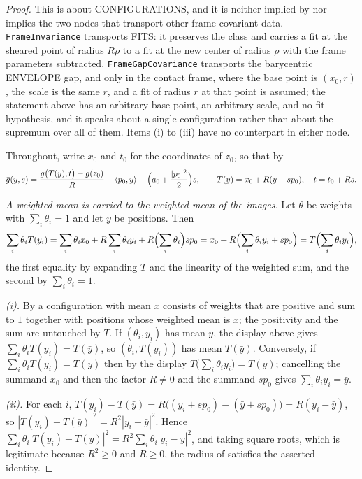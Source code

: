 \begin{proof}
This is about CONFIGURATIONS, and it is neither implied by nor implies the two
nodes that transport other frame-covariant data. \texttt{FrameInvariance}
transports FITS: it preserves the class and carries a fit at the sheared point
of radius $R\rho$ to a fit at the new center of radius $\rho$ with the frame
parameters subtracted. \texttt{FrameGapCovariance} transports the barycentric
ENVELOPE gap, and only in the contact frame, where the base point is $(x_0,r)$,
the scale is the same $r$, and a fit of radius $r$ at that point is assumed;
the statement above has an arbitrary base point, an arbitrary scale, and no fit
hypothesis, and it speaks about a single configuration rather than about the
supremum over all of them. Items (i) to (iii) have no counterpart in either
node.

Throughout, write $x_0$ and $t_0$ for the coordinates of $z_0$, so that by
\[
  \bar g(y,s)=\frac{g\bigl(T(y),t\bigr)-g(z_0)}{R}
     -\langle p_0,y\rangle-\Bigl(a_0+\frac{|p_0|^2}{2}\Bigr)s ,
  \qquad T(y)=x_0+R(y+sp_0),\quad t=t_0+Rs .
\]

\emph{A weighted mean is carried to the weighted mean of the images.} Let
$\theta$ be weights with $\sum_i\theta_i=1$ and let $y$ be positions. Then
\[
  \sum_i\theta_iT(y_i)
   =\sum_i\theta_ix_0+R\sum_i\theta_iy_i+R\Bigl(\sum_i\theta_i\Bigr)sp_0
   =x_0+R\Bigl(\sum_i\theta_iy_i+sp_0\Bigr)
   =T\Bigl(\sum_i\theta_iy_i\Bigr),
\]
the first equality by expanding $T$ and the linearity of the weighted sum, and
the second by $\sum_i\theta_i=1$.

\emph{(i).} By  a configuration with mean $x$ consists of
weights that are positive and sum to $1$ together with positions whose weighted
mean is $x$; the positivity and the sum are untouched by $T$. If
$(\theta_i,y_i)$ has mean $\bar y$, the display above gives
$\sum_i\theta_iT(y_i)=T(\bar y)$, so $(\theta_i,T(y_i))$ has mean $T(\bar y)$.
Conversely, if $\sum_i\theta_iT(y_i)=T(\bar y)$ then by the display
$T\bigl(\sum_i\theta_iy_i\bigr)=T(\bar y)$; cancelling the summand $x_0$ and
then the factor $R\ne0$ and the summand $sp_0$ gives
$\sum_i\theta_iy_i=\bar y$.

\emph{(ii).} For each $i$,
$T(y_i)-T(\bar y)=R\bigl((y_i+sp_0)-(\bar y+sp_0)\bigr)=R(y_i-\bar y)$, so
$|T(y_i)-T(\bar y)|^2=R^2|y_i-\bar y|^2$. Hence
$\sum_i\theta_i|T(y_i)-T(\bar y)|^2=R^2\sum_i\theta_i|y_i-\bar y|^2$, and taking
square roots, which is legitimate because $R^2\ge0$ and $R\ge0$, the radius of
 satisfies the asserted identity.


\end{proof}
